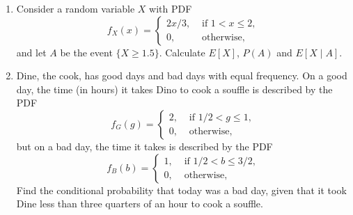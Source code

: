 \documentclass[paper=usletter, fontsize=12pt]{article}
\begin{document}
\begin{enumerate}
\begin{enumerate}
        \end{enumerate}

        \item Consider a random variable $X$ with PDF
        \begin{equation*}
            f_X(x) = \begin{cases}
                2x/3, & \text{ if } 1 < x \le 2,\\
                0, & \text{ otherwise, }
            \end{cases}
        \end{equation*}
        and let $A$ be the event $\{X \ge 1.5\}$. Calculate $E[X]$, $P(A)$ and
        $E[X \mid A]$.
        \begin{cproof}
        \end{cproof}

        \item Dine, the cook, has good days and bad days with equal frequency.
        On a good day, the time (in hours) it takes Dino to cook a souffle is
        described by the PDF
        \begin{equation*}
            f_G(g) = \begin{cases}
                2, & \text{ if } 1/2 < g \le 1,\\
                0, & \text{ otherwise, }
            \end{cases}
        \end{equation*}
        but on a bad day, the time it takes is described by the PDF
        \begin{equation*}
            f_B(b) = \begin{cases}
                1, & \text{ if } 1/2 < b \le 3/2,\\
                0, & \text{ otherwise, }
            \end{cases}
        \end{equation*}
        Find the conditional probability that today was a bad day, given that
        it took Dine less than three quarters of an hour to cook a souffle.
        \begin{cproof}
        \end{cproof}



\end{enumerate}
\end{document}
